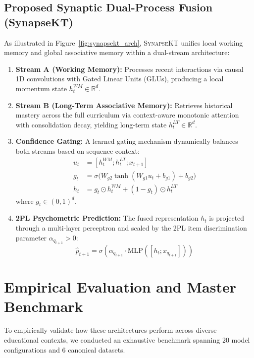 \documentclass[11pt]{article}
\begin{document}
\subsection{Proposed Synaptic Dual-Process Fusion (SynapseKT)}
As illustrated in Figure~\ref{fig:synapsekt_arch}, \textsc{SynapseKT} unifies local working memory and global associative memory within a dual-stream architecture:
\begin{enumerate}
    \item \textbf{Stream A (Working Memory):} Processes recent interactions via causal 1D convolutions with Gated Linear Units (GLUs), producing a local momentum state $h_t^{WM} \in \mathbb{R}^d$.
    \item \textbf{Stream B (Long-Term Associative Memory):} Retrieves historical mastery across the full curriculum via context-aware monotonic attention with consolidation decay, yielding long-term state $h_t^{LT} \in \mathbb{R}^d$.
    \item \textbf{Confidence Gating:} A learned gating mechanism dynamically balances both streams based on sequence context:
    \begin{align}
    u_t &= [h_t^{WM} ; h_t^{LT} ; x_{t+1}] \\
    g_t &= \sigma\big(W_{g2} \tanh(W_{g1} u_t + b_{g1}) + b_{g2}\big) \\
    h_t &= g_t \odot h_t^{WM} + (1 - g_t) \odot h_t^{LT}
    \end{align}
    where $g_t \in (0, 1)^d$.
    \item \textbf{2PL Psychometric Prediction:} The fused representation $h_t$ is projected through a multi-layer perceptron and scaled by the 2PL item discrimination parameter $\alpha_{q_{t+1}} > 0$:
    \begin{equation}
    \hat{p}_{t+1} = \sigma\left(\alpha_{q_{t+1}} \cdot \text{MLP}([h_t ; x_{q_{t+1}}])\right)
    \end{equation}
\end{enumerate}

\section{Empirical Evaluation and Master Benchmark}
\label{sec:experiments}

To empirically validate how these architectures perform across diverse educational contexts, we conducted an exhaustive benchmark spanning 20 model configurations and 6 canonical datasets.
\end{document}
